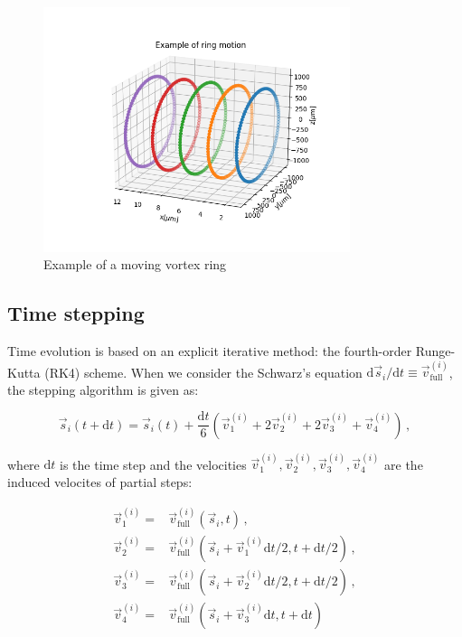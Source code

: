 \begin{figure}[h]
	\centering
	\includegraphics[width=0.8\textwidth]{graphics/simul/time-example}
	\caption{Example of a moving vortex ring}
\end{figure}

\subsection*{Time stepping}

Time evolution is based on an explicit iterative method: the fourth-order Runge-Kutta (RK4) scheme. When we consider the Schwarz's equation $\text{d}\vec{s}_i / \text{d}t \equiv \vec{v}_{\text{full}}^{(i)}$, the stepping algorithm is given as:

\begin{equation}
\vec{s}_{i}(t+\text{d}t) =
\vec{s}_{i}(t) +
\frac{\text{d}t}{6} (\vec{v}_1^{(i)} + 2\vec{v}_2^{(i)} + 2\vec{v}_3^{(i)} + \vec{v}_4^{(i)})\,,
\end{equation}

where $\text{d}t$ is the time step and the velocities $\vec{v}_1^{(i)}, \vec{v}_2^{(i)}, \vec{v}_3^{(i)}, \vec{v}_4^{(i)}$ are the induced velocites of partial steps:

\begin{align}
\vec{v}_1^{(i)} =& \vec{v}_{\text{full}}^{(i)}
(\vec{s}_i, t)\,,
\\
\vec{v}_2^{(i)} =& \vec{v}_{\text{full}}^{(i)}
(\vec{s}_i + \vec{v}_1^{(i)} \text{d}t / 2, t + \text{d}t / 2)\,,
\\
\vec{v}_3^{(i)} =& \vec{v}_{\text{full}}^{(i)}
(\vec{s}_i + \vec{v}_2^{(i)} \text{d}t / 2, t + \text{d}t / 2)\,,
\\
\vec{v}_4^{(i)} =& \vec{v}_{\text{full}}^{(i)}
(\vec{s}_i + \vec{v}_3^{(i)} \text{d}t, t + \text{d}t)
\end{align}

